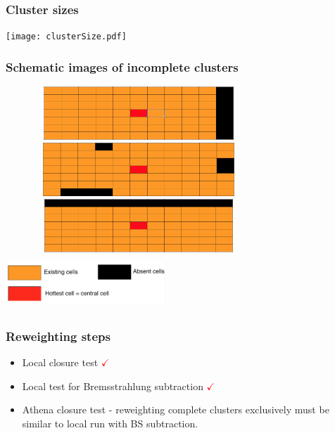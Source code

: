 \documentclass{beamer}
\begin{document}
\begin{frame}
\frametitle{Cluster sizes}

\centering
\texttt{[image: clusterSize.pdf]}\\

\end{frame}
\begin{frame}
\frametitle{Schematic images of incomplete clusters}

\centering
\includegraphics[width=10cm,height=2cm]{70_cells.png}\\
\includegraphics[width=10cm,height=2cm]{71_cells.png}\\
\includegraphics[width=10cm,height=2cm]{66_cells.png}\\
\includegraphics[width=6cm,height=2cm]{cells_legend.png}\\


\end{frame}
\begin{frame}
\frametitle{Reweighting steps}
\begin{itemize}
\item Local closure test \textcolor{red}{ $\checkmark$}\\
\item Local test for Bremsstrahlung subtraction \textcolor{red}{ $\checkmark$}\\
\item Athena closure test - reweighting complete clusters exclusively must be similar to local run with BS subtraction.\\
\end{itemize}
\end{frame}
\end{document}
